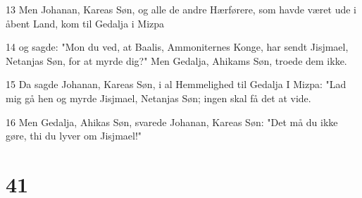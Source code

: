 \par 13 Men Johanan, Kareas Søn, og alle de andre Hærførere, som havde været ude i åbent Land, kom til Gedalja i Mizpa
\par 14 og sagde: "Mon du ved, at Baalis, Ammoniternes Konge, har sendt Jisjmael, Netanjas Søn, for at myrde dig?" Men Gedalja, Ahikams Søn, troede dem ikke.
\par 15 Da sagde Johanan, Kareas Søn, i al Hemmelighed til Gedalja I Mizpa: "Lad mig gå hen og myrde Jisjmael, Netanjas Søn; ingen skal få det at vide.
\par 16 Men Gedalja, Ahikas Søn, svarede Johanan, Kareas Søn: "Det må du ikke gøre, thi du lyver om Jisjmael!"

\chapter{41}

